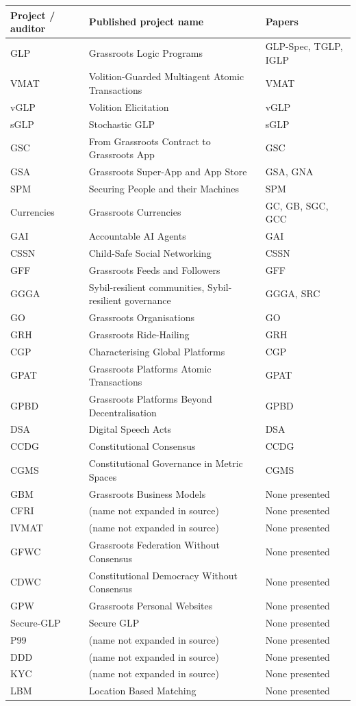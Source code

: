 {\small
\begin{longtable}{L{2.0cm}L{7.6cm}L{3.6cm}}
\toprule
\textbf{Project / auditor} & \textbf{Published project name} & \textbf{Papers} \\
\midrule
\endhead
GLP & Grassroots Logic Programs & GLP-Spec, TGLP, IGLP \\
VMAT & Volition-Guarded Multiagent Atomic Transactions & VMAT \\
vGLP & Volition Elicitation & vGLP \\
sGLP & Stochastic GLP & sGLP \\
GSC & From Grassroots Contract to Grassroots App & GSC \\
GSA & Grassroots Super-App and App Store & GSA, GNA \\
SPM & Securing People and their Machines & SPM \\
Currencies & Grassroots Currencies & GC, GB, SGC, GCC \\
GAI & Accountable AI Agents & GAI \\
CSSN & Child-Safe Social Networking & CSSN \\
GFF & Grassroots Feeds and Followers & GFF \\
GGGA & Sybil-resilient communities, Sybil-resilient governance & GGGA, SRC \\
GO & Grassroots Organisations & GO \\
GRH & Grassroots Ride-Hailing & GRH \\
CGP & Characterising Global Platforms & CGP \\
GPAT & Grassroots Platforms Atomic Transactions & GPAT \\
GPBD & Grassroots Platforms Beyond Decentralisation & GPBD \\
DSA & Digital Speech Acts & DSA \\
CCDG & Constitutional Consensus & CCDG \\
CGMS & Constitutional Governance in Metric Spaces & CGMS \\
GBM & Grassroots Business Models & None presented \\
CFRI & (name not expanded in source) & None presented \\
IVMAT & (name not expanded in source) & None presented \\
GFWC & Grassroots Federation Without Consensus & None presented \\
CDWC & Constitutional Democracy Without Consensus & None presented \\
GPW & Grassroots Personal Websites & None presented \\
Secure-GLP & Secure GLP & None presented \\
P99 & (name not expanded in source) & None presented \\
DDD & (name not expanded in source) & None presented \\
KYC & (name not expanded in source) & None presented \\
LBM & Location Based Matching & None presented \\
\bottomrule
\end{longtable}
}

